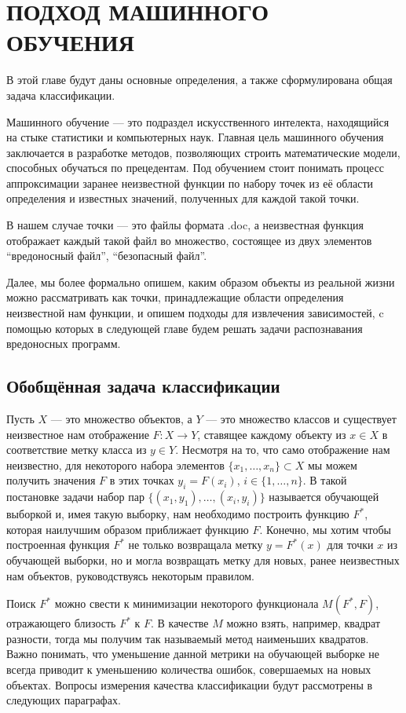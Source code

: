 \chapter{ПОДХОД МАШИННОГО ОБУЧЕНИЯ}

В этой главе будут даны основные определения, а также  сформулирована общая задача классификации.

Машинного обучение — это подраздел искусственного интелекта, находящийся на стыке статистики и компьютерных наук. Главная цель машинного обучения заключается в разработке методов, позволяющих строить математические модели, способных обучаться по прецедентам. Под обучением стоит понимать процесс аппроксимации заранее неизвестной функции по набору точек из её области определения и известных значений, полученных для каждой такой точки.

В нашем случае точки — это файлы формата .doc, а неизвестная функция отображает каждый такой файл во множество, состоящее из двух элементов {“вредоносный файл”, “безопасный файл”}.

Далее, мы более формально опишем, каким образом объекты  из реальной жизни можно рассматривать как точки, принадлежащие области определения неизвестной нам функции, и опишем подходы для извлечения зависимостей, c помощью которых в следующей главе будем решать задачи распознавания вредоносных программ.

\section{Обобщённая задача классификации}

Пусть $X$ — это множество объектов, а $Y$ — это множество классов и существует неизвестное нам отображение $F : X \to Y$, ставящее каждому объекту из $x \in X$ в соответствие метку класса из $y \in Y$.
Несмотря на то, что само отображение нам неизвестно, для некоторого набора элементов $\{ x_1, \dots , x_n \} \subset X$ мы можем получить значения $F$ в этих точках  $y_i = F(x_i)$, $i \in \{ 1, \dots, n \}$.
В такой постановке задачи набор пар $\{ (x_1, y_1), \dots, (x_i, y_i) \}$ называется обучающей выборкой и, имея такую выборку, нам необходимо построить функцию $F^*$, которая наилучшим образом приближает функцию $F$.
Конечно, мы хотим чтобы построенная функция $F^*$ не только возвращала метку $y = F^*(x)$ для точки $x$ из обучающей выборки, но и могла возвращать метку для новых, ранее неизвестных нам объектов, руководствуясь некоторым правилом.

Поиск $F^*$ можно свести к минимизации некоторого функционала $M(F^*, F)$, отражающего близость $F^*$ к $F$. В качестве $M$ можно взять, например, квадрат разности, тогда мы получим так называемый метод наименьших квадратов. Важно понимать, что уменьшение данной метрики на обучающей выборке не всегда приводит к уменьшению количества ошибок, совершаемых на новых объектах. Вопросы измерения качества классификации будут рассмотрены в следующих параграфах.

